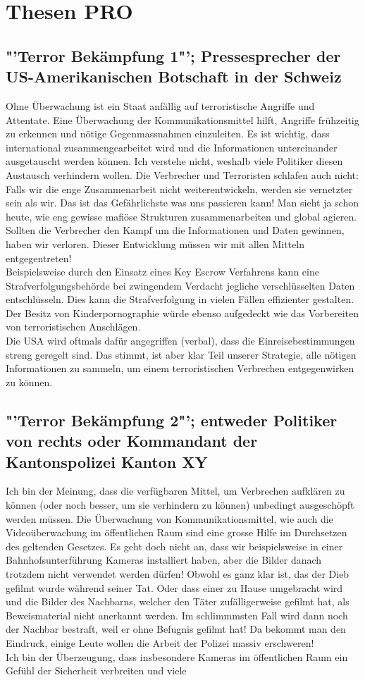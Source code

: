 \section*{Thesen PRO}\subsection*{"'Terror Bekämpfung 1"'; Pressesprecher der US-Amerikanischen Botschaft in der Schweiz}Ohne Überwachung ist ein Staat anfällig auf terroristische Angriffe und Attentate. Eine Überwachung der Kommunikationsmittel hilft, Angriffe frühzeitig zu erkennen und nötige Gegenmassnahmen einzuleiten. Es ist wichtig, dass international zusammengearbeitet wird und die Informationen untereinander ausgetauscht werden können. Ich verstehe nicht, weshalb viele Politiker diesen Austausch verhindern wollen. Die Verbrecher und Terroristen schlafen auch nicht: Falls wir die enge Zusammenarbeit nicht weiterentwickeln, werden sie vernetzter sein als wir. Das ist das Gefährlichste was uns passieren kann! Man sieht ja schon heute, wie eng gewisse mafiöse Strukturen zusammenarbeiten und global agieren. Sollten die Verbrecher den Kampf um die Informationen und Daten gewinnen, haben wir verloren. Dieser Entwicklung müssen wir mit allen Mitteln entgegentreten!\\Beispielsweise durch den Einsatz eines Key Escrow Verfahrens kann eine Strafverfolgungsbehörde bei zwingendem Verdacht jegliche verschlüsselten Daten entschlüsseln. Dies kann die Strafverfolgung in vielen Fällen effizienter gestalten. Der Besitz von Kinderpornographie würde ebenso aufgedeckt wie das Vorbereiten von terroristischen Anschlägen.\\Die USA wird oftmals dafür angegriffen (verbal), dass die Einreisebestimmungen streng geregelt sind. Das stimmt, ist aber klar Teil unserer Strategie, alle nötigen Informationen zu sammeln, um einem terroristischen Verbrechen entgegenwirken zu können.\subsection*{"'Terror Bekämpfung 2"'; entweder Politiker von rechts oder Kommandant der Kantonspolizei Kanton XY}Ich bin der Meinung, dass die verfügbaren Mittel, um Verbrechen aufklären zu können (oder noch besser, um sie verhindern zu können) unbedingt ausgeschöpft werden müssen. Die Überwachung von Kommunikationsmittel, wie auch die Videoüberwachung im öffentlichen Raum sind eine grosse Hilfe im Durchsetzen des geltenden Gesetzes. Es geht doch nicht an, dass wir beispielsweise in einer Bahnhofsunterführung Kameras installiert haben, aber die Bilder danach trotzdem nicht verwendet werden dürfen! Obwohl es ganz klar ist, das der Dieb gefilmt wurde während seiner Tat. Oder dass einer zu Hause umgebracht wird und die Bilder des Nachbarns, welcher den Täter zufälligerweise gefilmt hat, als Beweismaterial nicht anerkannt werden. Im schlimmmsten Fall wird dann noch der Nachbar bestraft, weil er ohne Befugnis gefilmt hat! Da bekommt man den Eindruck, einige Leute wollen die Arbeit der Polizei massiv erschweren!\\Ich bin der Überzeugung, dass insbesondere Kameras im öffentlichen Raum ein Gefühl der Sicherheit verbreiten und viele 